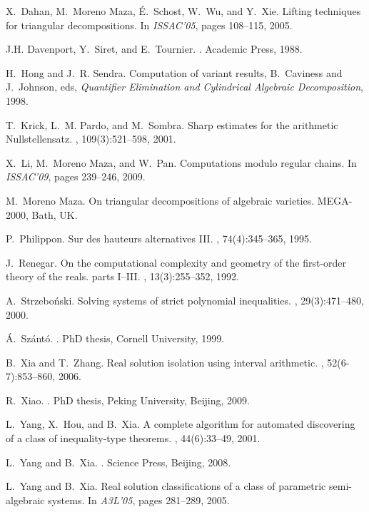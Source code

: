 \documentclass{sig-alternate}
\begin{document}
\begin{thebibliography}{10}
X.~{Dahan}, M.~{{Moreno Maza}}, {\'E}.~{Schost}, W.~{Wu}, and Y.~{Xie}.
\newblock Lifting techniques for triangular decompositions.
\newblock In {\em ISSAC'05}, pages 108--115, 2005.

J.H. Davenport, Y.~Siret, and E.~Tournier.
.
\newblock Academic Press, 1988.

H.~Hong and J.~R. Sendra.
\newblock Computation of variant results,
\newblock B.~Caviness and J.~Johnson, eds, {\em Quantifier Elimination
  and Cylindrical Algebraic Decomposition}, 
1998.


T.~Krick, L.~M. Pardo, and M.~Sombra.
\newblock Sharp estimates for the arithmetic {N}ullstellensatz.
, 109(3):521--598, 2001.



X.~Li, M.~{Moreno Maza}, and W.~Pan.
\newblock Computations modulo regular chains.
\newblock In {\em ISSAC'09}, pages 239--246, 2009.

M.~{{Moreno Maza}}.
\newblock On triangular decompositions of algebraic varieties.
\newblock MEGA-2000, Bath, UK.

P.~Philippon.
\newblock Sur des hauteurs alternatives {III}.
, 74(4):345--365, 1995.

J.~Renegar.
\newblock On the computational complexity and geometry of the first-order
  theory of the reals. parts {I}--{III}.
, 13(3):255--352, 1992.

A.~Strzebo\'{n}ski.
\newblock Solving systems of strict polynomial inequalities.
, 29(3):471--480, 2000.

{\'A}.~Sz{\'a}nt{\'o}.
.
\newblock PhD thesis, Cornell University, 1999.

B.~Xia and T.~Zhang.
\newblock Real solution isolation using interval arithmetic.
, 52(6-7):853--860, 2006.

R.~Xiao.
.
\newblock PhD thesis, Peking University, Beijing, 2009.


L.~Yang, X.~Hou, and B.~Xia.
\newblock A complete algorithm for automated discovering of a class of
  inequality-type theorems.
, 44(6):33--49, 2001.

L.~Yang and B.~Xia.
.
\newblock Science Press, Beijing, 2008.

L.~Yang and B.~Xia.
\newblock Real solution classifications of a class of parametric semi-algebraic
  systems.
\newblock In {\em A3L'05}, pages 281--289, 2005.

\end{thebibliography}
\end{document}
